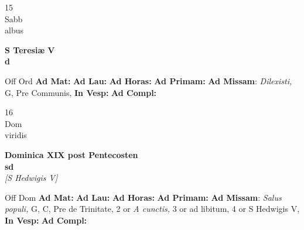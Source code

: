 \documentclass[10pt, openany]{book}
\begin{document}
        \begin{center}
            \begin{minipage}{3.5in}
                \vspace{2em}
                \begin{minipage}{0.5in}
                    {\Huge 15} \\
                    {\normalsize Sabb} \\
                    {\normalsize albus}
                \end{minipage}
                \begin{minipage}{3.0in}
                    \textbf{ \large S Teresiæ V \\
                    \textnormal{\normalsize d}} \\ 
                \end{minipage}
                \begin{justify}Off Ord
                    \textbf{Ad Mat: }
                    \textbf{Ad Lau: }
                    \textbf{Ad Horas: }
                    \textbf{Ad Primam: }\textbf{Ad Missam}: \textit{Dilexisti,} G, Pre Communis,  
                    \textbf{In Vesp: }
                    \textbf{Ad Compl: }
                \end{justify}
            \end{minipage}
        \end{center}
    
        \begin{center}
            \begin{minipage}{3.5in}
                \vspace{2em}
                \begin{minipage}{0.5in}
                    {\Huge 16} \\
                    {\normalsize Dom} \\
                    {\normalsize viridis}
                \end{minipage}
                \begin{minipage}{3.0in}
                    \textbf{ \large Dominica XIX post Pentecosten \\
                    \textnormal{\normalsize sd}} \\ \textit{[S Hedwigis V]} \\ 
                \end{minipage}
                \begin{justify}Off Dom
                    \textbf{Ad Mat: }
                    \textbf{Ad Lau: }
                    \textbf{Ad Horas: }
                    \textbf{Ad Primam: }\textbf{Ad Missam}: \textit{Salus populi,} G, C, Pre de Trinitate, 2 or \textit{A cunctis,} 3 or ad libitum, 4 or S Hedwigis V,  
                    \textbf{In Vesp: }
                    \textbf{Ad Compl: }
                \end{justify}
            \end{minipage}
        \end{center}
    
\end{document}
